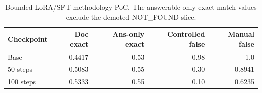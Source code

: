 \begin{table}[t]
\centering
\small
\begin{tabular}{lrrrr}
\hline
Checkpoint & Doc exact & Ans-only exact & Controlled false & Manual false \\
\hline
Base & 0.4417 & 0.53 & 0.98 & 1.0 \\
50 steps & 0.5083 & 0.55 & 0.30 & 0.8941 \\
100 steps & 0.5333 & 0.55 & 0.10 & 0.6235 \\
\hline
\end{tabular}
\caption{Bounded LoRA/SFT methodology PoC. The answerable-only exact-match values exclude the demoted NOT\_FOUND slice.}
\label{tab:lora-poc}
\end{table}
